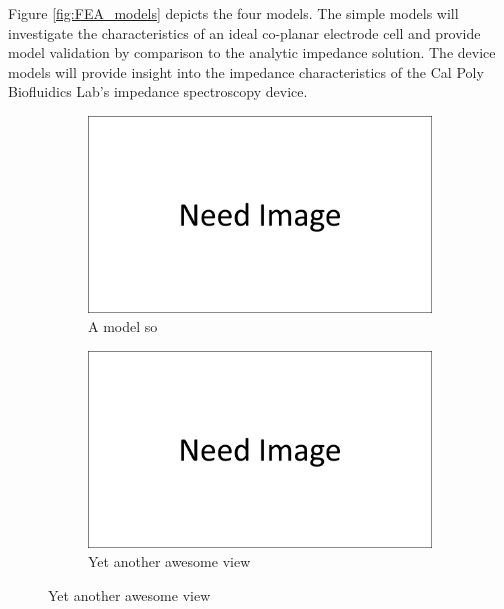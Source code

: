 \par Figure \ref{fig:FEA_models} depicts the four models. The simple models will investigate the characteristics of an ideal co-planar electrode cell and provide model validation by comparison to the analytic impedance solution. The device models will provide insight into the impedance characteristics of the Cal Poly Biofluidics Lab's impedance spectroscopy device. 

\begin{figure}
    \centering
    \begin{subfigure}[b]{0.45\textwidth}
        \centering
        \includegraphics[width=\textwidth]{images/need_image.png}
        \caption{A model so}
        \label{fig:simple_medium_fea_model}
    \end{subfigure}
    \hfill
    \begin{subfigure}[b]{0.45\textwidth}
        \centering
        \includegraphics[width=\textwidth]{images/need_image.png}
        \caption{Yet another awesome view}
        \label{fig:simple_medium_with_cell_fea_model}
    \end{subfigure}

\end{figure}
